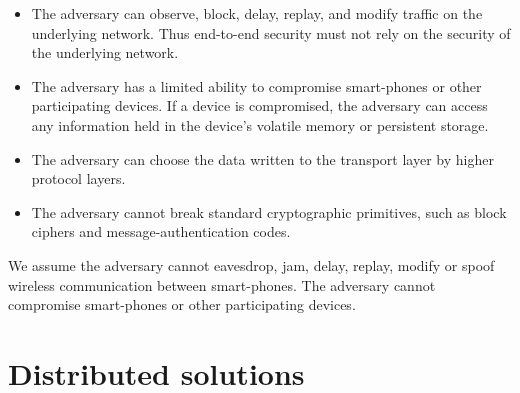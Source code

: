 \begin{itemize}
\item{
	The adversary can observe, block, delay, replay, and modify traffic on the underlying network.
	Thus end-to-end security must not rely on the security of the underlying network.
}
\item{
	The adversary has a limited ability to compromise smart-phones or other participating devices.
	If a device is compromised, the adversary can access any information held in the device's volatile memory or persistent storage.
}
\item{
	The adversary can choose the data written to the transport layer by higher protocol layers.
}
\item{
	The adversary cannot break standard cryptographic primitives, such as block ciphers and message-authentication codes.
}
\end{itemize}
We assume the adversary cannot eavesdrop, jam, delay, replay, modify or spoof wireless communication between smart-phones.
The adversary cannot compromise smart-phones or other participating devices.

\section{Distributed solutions}\label{sec:distributed_solutions}

